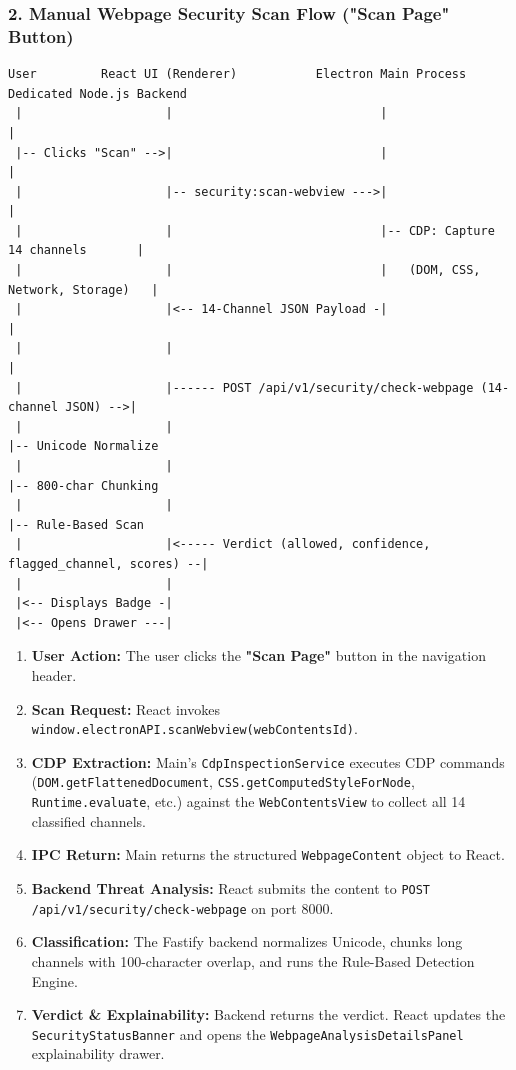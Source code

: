 \documentclass[11pt,a4paper]{article}
\begin{document}
\subsubsection{2. Manual Webpage Security Scan Flow ("Scan Page" Button)}
\begin{lstlisting}
User         React UI (Renderer)           Electron Main Process           Dedicated Node.js Backend
 |                    |                             |                                  |
 |-- Clicks "Scan" -->|                             |                                  |
 |                    |-- security:scan-webview --->|                                  |
 |                    |                             |-- CDP: Capture 14 channels       |
 |                    |                             |   (DOM, CSS, Network, Storage)   |
 |                    |<-- 14-Channel JSON Payload -|                                  |
 |                    |                                                                |
 |                    |------ POST /api/v1/security/check-webpage (14-channel JSON) -->|
 |                    |                                                                |-- Unicode Normalize
 |                    |                                                                |-- 800-char Chunking
 |                    |                                                                |-- Rule-Based Scan
 |                    |<----- Verdict (allowed, confidence, flagged_channel, scores) --|
 |                    |
 |<-- Displays Badge -|
 |<-- Opens Drawer ---|
\end{lstlisting}
\begin{enumerate}[leftmargin=1.4em]
\item \textbf{User Action:} The user clicks the \textbf{"Scan Page"} button in the navigation header.
\item \textbf{Scan Request:} React invokes \texttt{window.electronAPI.scanWebview(webContentsId)}.
\item \textbf{CDP Extraction:} Main's \texttt{CdpInspectionService} executes CDP commands (\texttt{DOM.getFlattenedDocument}, \texttt{CSS.getComputedStyleForNode}, \texttt{Runtime.evaluate}, etc.) against the \texttt{WebContentsView} to collect all 14 classified channels.
\item \textbf{IPC Return:} Main returns the structured \texttt{WebpageContent} object to React.
\item \textbf{Backend Threat Analysis:} React submits the content to \texttt{POST /api/v1/security/check-webpage} on port 8000.
\item \textbf{Classification:} The Fastify backend normalizes Unicode, chunks long channels with 100-character overlap, and runs the Rule-Based Detection Engine.
\item \textbf{Verdict \& Explainability:} Backend returns the verdict. React updates the \texttt{SecurityStatusBanner} and opens the \texttt{WebpageAnalysisDetailsPanel} explainability drawer.
\end{enumerate}
\end{document}
